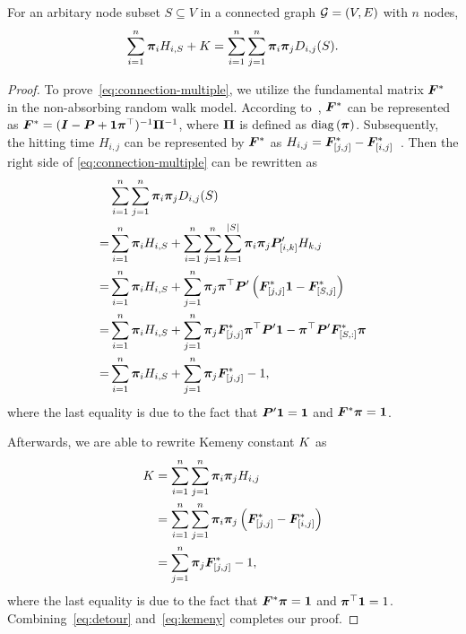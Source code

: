 \documentclass[sigconf]{acmart}
\begin{document}
\begin{theorem}\label{thm:connection-multiple}
  For an arbitary node subset \(S\subseteq V\) in a connected graph \(\mathcal{G}=(V,E)\) with \(n\) nodes,
  \begin{equation}\label{eq:connection-multiple}
    \sum_{i=1}^n\boldsymbol{\pi}_iH_{i,S}+K=\sum_{i=1}^n\sum_{j=1}^n\boldsymbol{\pi}_i\boldsymbol{\pi}_jD_{i,j}(S).
  \end{equation}
\end{theorem}
\begin{proof}
  To prove~\eqref{eq:connection-multiple}, we utilize the fundamental matrix \(\boldsymbol{F}^*\) in the non-absorbing random walk model.
  According to~\cite{BoRaZh11}, \(\boldsymbol{F}^*\) can be represented as \(\boldsymbol{F}^*=(\boldsymbol{I}-\boldsymbol{P}+\boldsymbol{1}\boldsymbol{\pi}^\top)^{-1}\boldsymbol{\Pi}^{-1}\), where \(\boldsymbol{\Pi}\) is defined as \(\rm{diag}\left( \boldsymbol{\pi} \right)\).
  Subsequently, the hitting time \(H_{i,j}\) can be represented by \(\boldsymbol{F}^*\) as \(H_{i,j}=\boldsymbol{F}^*_{[j,j]}-\boldsymbol{F}^*_{[i,j]}\)~\cite{BoRaZh11}.
  Then the right side of \eqref{eq:connection-multiple} can be rewritten as
  \begin{equation}\label{eq:detour}
    \begin{split}
      &\sum_{i=1}^n\sum_{j=1}^n\boldsymbol{\pi}_i\boldsymbol{\pi}_jD_{i,j}(S)\\
      =&\sum_{i=1}^n\boldsymbol{\pi}_i H_{i,S}+\sum_{i=1}^n\sum_{j=1}^n\sum_{k=1}^{\left|S \right|}\boldsymbol{\pi}_i\boldsymbol{\pi}_j\boldsymbol{P}'_{[i,k]}H_{k,j}  \\
      =&\sum_{i=1}^n\boldsymbol{\pi}_i H_{i,S}+\sum_{j=1}^n\boldsymbol{\pi}_j\boldsymbol{\pi}^\top\boldsymbol{P}'\left( \boldsymbol{F}^*_{[j,j]}\boldsymbol{1}-\boldsymbol{F}^*_{[S,j]} \right)                        \\
      =&\sum_{i=1}^n\boldsymbol{\pi}_i H_{i,S}+\sum_{j=1}^n\boldsymbol{\pi}_j\boldsymbol{F}^*_{[j,j]}\boldsymbol{\pi}^\top\boldsymbol{P}'\boldsymbol{1}-\boldsymbol{\pi}^\top\boldsymbol{P}'\boldsymbol{F}^*_{[S,:]}\boldsymbol{\pi} \\
      =&\sum_{i=1}^n\boldsymbol{\pi}_i H_{i,S}+\sum_{j=1}^n\boldsymbol{\pi}_j\boldsymbol{F}^*_{[j,j]}-1,
    \end{split}
  \end{equation}
  where the last equality is due to the fact that \(\boldsymbol{P}'\boldsymbol{1}=\boldsymbol{1}\) and \(\boldsymbol{F}^*\boldsymbol{\pi}=\boldsymbol{1}\).

  Afterwards, we are able to rewrite Kemeny constant \(K\) as
  \begin{equation}\label{eq:kemeny}
    \begin{split}
      K&=\sum_{i=1}^n\sum_{j=1}^n\boldsymbol{\pi}_i\boldsymbol{\pi}_jH_{i,j}\\
      &=\sum_{i=1}^n\sum_{j=1}^n\boldsymbol{\pi}_i\boldsymbol{\pi}_j\left( \boldsymbol{F}^*_{[j,j]}-\boldsymbol{F}^*_{[i,j]} \right)\\
      &=\sum_{j=1}^n\boldsymbol{\pi}_j\boldsymbol{F}^*_{[j,j]}-1,
    \end{split}
  \end{equation}
  where the last equality is due to the fact that \(\boldsymbol{F}^*\boldsymbol{\pi}=\boldsymbol{1}\) and \(\boldsymbol{\pi}^\top\boldsymbol{1}=1\).
  Combining~\eqref{eq:detour} and~\eqref{eq:kemeny} completes our proof.
\end{proof}
\end{document}
